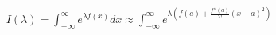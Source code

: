 \documentclass[preview]{standalone}
\begin{document}
\begin{align*}
I(\lambda) = \displaystyle \int_{-\infty}^{\infty} e^{\lambda f(x)} dx \approx  \int_{-\infty}^{\infty} e^{\lambda (f(a) + \frac{f''(a)}{2!}(x - a)^2)}
\end{align*}
\end{document}
